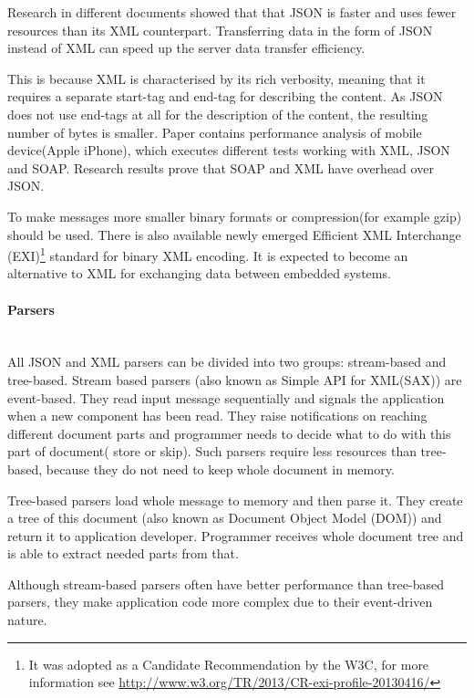 Research in different documents \cite{5931189,NurseitovPRI09} showed that
that JSON is faster and uses fewer resources than its XML
counterpart.
Transferring data in the form of JSON instead of XML can speed up the server
data transfer efficiency.

This is because XML is characterised by its rich verbosity,
meaning that it requires a separate start-tag and end-tag for describing the content.
As JSON does not use end-tags at all for the description of the content, the
resulting number of bytes is smaller.
Paper \cite{5931189} contains performance analysis of mobile device(Apple
iPhone), which executes different tests working with XML, JSON and SOAP.
Research results prove that SOAP and XML have overhead over JSON.

To make messages more smaller binary formats or compression(for example gzip)  
should be used. There is also available newly emerged Efficient XML Interchange
(EXI)\footnote{It was adopted as a Candidate Recommendation by the
W3C, for more information see
\url{http://www.w3.org/TR/2013/CR-exi-profile-20130416/}} standard for binary XML encoding. It is expected to become an alternative to XML for exchanging data between embedded systems\cite{6120046}.

\paragraph{Parsers} ~\\
All JSON and XML parsers can be divided into two groups: stream-based and
tree-based. Stream based parsers (also known as Simple API for XML(SAX)) are
event-based. They read input message sequentially and signals the application when a new component has
been read. They raise notifications on reaching different document parts and
programmer needs to decide what to do with this part of document( store or
skip). Such parsers require less resources than tree-based, because they do not
need to keep whole document in memory.

Tree-based parsers load whole message to memory and then parse it. They create a
tree of this document (also known as Document Object Model (DOM)) and return it
to application developer. Programmer receives whole document tree and is able to
extract needed parts from that.

Although stream-based parsers often
have better performance than tree-based parsers, they make application code more
complex due to their event-driven nature.

